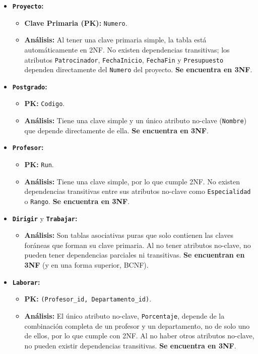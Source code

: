 \begin{itemize}
    \item \textbf{\texttt{Proyecto}:}
    \begin{itemize}
        \item \textbf{Clave Primaria (PK):} \texttt{Numero}.
        \item \textbf{Análisis:} Al tener una clave primaria simple, la tabla está automáticamente en 2NF. No existen dependencias transitivas; los atributos \texttt{Patrocinador}, \texttt{Fe\-cha\-I\-ni\-ci\-o}, \texttt{Fe\-cha\-Fin} y \texttt{Presupuesto} dependen directamente del \texttt{Numero} del proyecto. \textbf{Se encuentra en 3NF}.
    \end{itemize}

    \item \textbf{\texttt{Postgrado}:}
    \begin{itemize}
        \item \textbf{PK:} \texttt{Codigo}.
        \item \textbf{Análisis:} Tiene una clave simple y un único atributo no-clave (\texttt{Nombre}) que depende directamente de ella. \textbf{Se encuentra en 3NF}.
    \end{itemize}

    \item \textbf{\texttt{Profesor}:}
    \begin{itemize}
        \item \textbf{PK:} \texttt{Run}.
        \item \textbf{Análisis:} Tiene una clave simple, por lo que cumple 2NF. No existen dependencias transitivas entre sus atributos no-clave como \texttt{Especialidad} o \texttt{Rango}. \textbf{Se encuentra en 3NF}.
    \end{itemize}

    \item \textbf{\texttt{Dirigir}} y \textbf{\texttt{Trabajar}:}
    \begin{itemize}
        \item \textbf{Análisis:} Son tablas asociativas puras que solo contienen las claves foráneas que forman su clave primaria. Al no tener atributos no-clave, no pueden tener dependencias parciales ni transitivas. \textbf{Se encuentran en 3NF} (y en una forma superior, BCNF).
    \end{itemize}

    \item \textbf{\texttt{Laborar}:}
    \begin{itemize}
        \item \textbf{PK:} \texttt{(Profesor\_id, Departamento\_id)}.
        \item \textbf{Análisis:} El único atributo no-clave, \texttt{Porcentaje}, depende de la combinación completa de un profesor y un departamento, no de solo uno de ellos, por lo que cumple con 2NF. Al no haber otros atributos no-clave, no pueden existir dependencias transitivas. \textbf{Se encuentra en 3NF}.
    \end{itemize}


\end{itemize}
